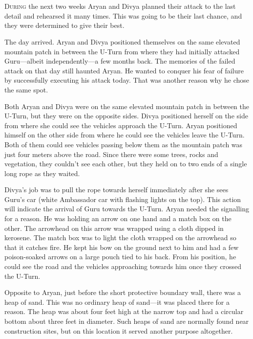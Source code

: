 \chapter{}

\lettrine{D}{uring} the next two weeks Aryan and Divya planned their attack to the last
detail and rehearsed it many times. This was going to be their last chance, and
they were determined to give their best.

The day arrived. Aryan and Divya positioned themselves on the same elevated
mountain patch in between the U-Turn from where they had initially attacked
Guru—albeit independently—a few months back. The memories of the failed attack
on that day still haunted Aryan. He wanted to conquer his fear of failure by
successfully executing his attack today. That was another reason why he chose
the same spot.

Both Aryan and Divya were on the same elevated mountain patch in between the
U-Turn, but they were on the opposite sides. Divya positioned herself on the
side from where she could see the vehicles approach the U-Turn. Aryan positioned
himself on the other side from where he could see the vehicles leave the U-Turn.
Both of them could see vehicles passing below them as the mountain patch was
just four meters above the road. Since there were some trees, rocks and
vegetation, they couldn't see each other, but they held on to two ends of a
single long rope as they waited.

Divya's job was to pull the rope towards herself immediately after she sees
Guru's car (white Ambassador car with flashing lights on the top). This action
will indicate the arrival of Guru towards the U-Turn. Aryan needed the signalling
for a reason. He was holding an arrow on one hand and a match box on the other.
The arrowhead on this arrow was wrapped using a cloth dipped in kerosene. The
match box was to light the cloth wrapped on the arrowhead so that it catches
fire. He kept his bow on the ground next to him and had a few poison-soaked
arrows on a large pouch tied to his back. From his position, he could see the
road and the vehicles approaching towards him once they crossed the U-Turn.

Opposite to Aryan, just before the short protective boundary wall, there was a
heap of sand. This was no ordinary heap of sand—it was placed there for a
reason. The heap was about four feet high at the narrow top and had a circular
bottom about three feet in diameter. Such heaps of sand are normally found near
construction sites, but on this location it served another purpose altogether.

